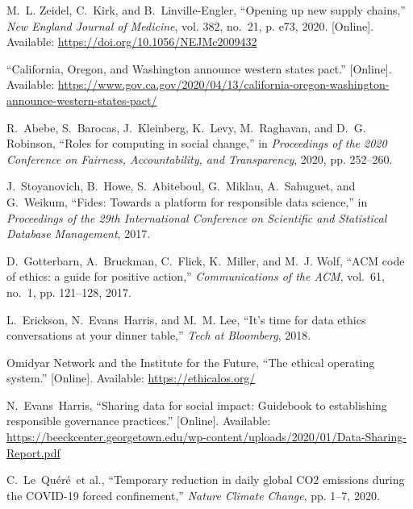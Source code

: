 \begin{thebibliography}{10}
\BIBentryALTinterwordspacing
M.~L. Zeidel, C.~Kirk, and B.~Linville-Engler, ``Opening up new supply
  chains,'' \emph{New England Journal of Medicine}, vol. 382, no.~21, p. e73,
  2020. [Online]. Available: \url{https://doi.org/10.1056/NEJMc2009432}
\BIBentrySTDinterwordspacing

\BIBentryALTinterwordspacing
``{California, Oregon, and Washington announce western states pact}.''
  [Online]. Available:
  \url{https://www.gov.ca.gov/2020/04/13/california-oregon-washington-announce-western-states-pact/}
\BIBentrySTDinterwordspacing

R.~Abebe, S.~Barocas, J.~Kleinberg, K.~Levy, M.~Raghavan, and D.~G. Robinson,
  ``Roles for computing in social change,'' in \emph{Proceedings of the 2020
  Conference on Fairness, Accountability, and Transparency}, 2020, pp.
  252--260.

J.~Stoyanovich, B.~Howe, S.~Abiteboul, G.~Miklau, A.~Sahuguet, and G.~Weikum,
  ``Fides: Towards a platform for responsible data science,'' in
  \emph{Proceedings of the 29th International Conference on Scientific and
  Statistical Database Management}, 2017.

D.~Gotterbarn, A.~Bruckman, C.~Flick, K.~Miller, and M.~J. Wolf, ``{ACM code of
  ethics: a guide for positive action},'' \emph{Communications of the ACM},
  vol.~61, no.~1, pp. 121--128, 2017.

L.~Erickson, N.~Evans~Harris, and M.~M. Lee, ``It's time for data ethics
  conversations at your dinner table,'' \emph{Tech at Bloomberg}, 2018.

\BIBentryALTinterwordspacing
{Omidyar Network and the Institute for the Future}, ``The ethical operating
  system.'' [Online]. Available: \url{https://ethicalos.org/}
\BIBentrySTDinterwordspacing

\BIBentryALTinterwordspacing
N.~Evans~Harris, ``Sharing data for social impact: Guidebook to establishing
  responsible governance practices.'' [Online]. Available:
  \url{https://beeckcenter.georgetown.edu/wp-content/uploads/2020/01/Data-Sharing-Report.pdf}
\BIBentrySTDinterwordspacing

C.~Le~Qu{\'e}r{\'e}~et al., ``{Temporary reduction in daily global CO2
  emissions during the COVID-19 forced confinement},'' \emph{Nature Climate
  Change}, pp. 1--7, 2020.


\end{thebibliography}
